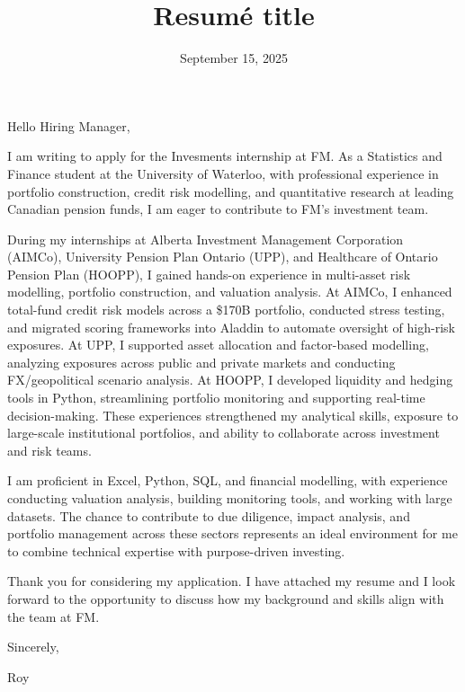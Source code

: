 \documentclass[11pt,a4paper,roman]{moderncv}        %
\title{Resumé title}                               %
\date{September 15, 2025}                              %
\begin{document}
\recipient{\phantom{1}}{}
\opening{\phantom{1}}
\closing{\phantom{1}}
\enclosure[\phantom{1}]{\phantom{1}}          %
\makelettertitle

Hello Hiring Manager,

I am writing to apply for the Invesments internship at FM. As a Statistics and Finance student at the University of Waterloo, with professional experience in portfolio construction, credit risk modelling, and quantitative research at leading Canadian pension funds, I am eager to contribute to FM’s investment team.

During my internships at Alberta Investment Management Corporation (AIMCo), University Pension Plan Ontario (UPP), and Healthcare of Ontario Pension Plan (HOOPP), I gained hands-on experience in multi-asset risk modelling, portfolio construction, and valuation analysis. At AIMCo, I enhanced total-fund credit risk models across a \$170B portfolio, conducted stress testing, and migrated scoring frameworks into Aladdin to automate oversight of high-risk exposures. At UPP, I supported asset allocation and factor-based modelling, analyzing exposures across public and private markets and conducting FX/geopolitical scenario analysis. At HOOPP, I developed liquidity and hedging tools in Python, streamlining portfolio monitoring and supporting real-time decision-making. These experiences strengthened my analytical skills, exposure to large-scale institutional portfolios, and ability to collaborate across investment and risk teams.

I am proficient in Excel, Python, SQL, and financial modelling, with experience conducting valuation analysis, building monitoring tools, and working with large datasets. The chance to contribute to due diligence, impact analysis, and portfolio management across these sectors represents an ideal environment for me to combine technical expertise with purpose-driven investing.

Thank you for considering my application. I have attached my resume and I look forward to the opportunity to discuss how my background and skills align with the team at FM.

Sincerely,

Roy
\vspace{0.5cm}
\end{document}
